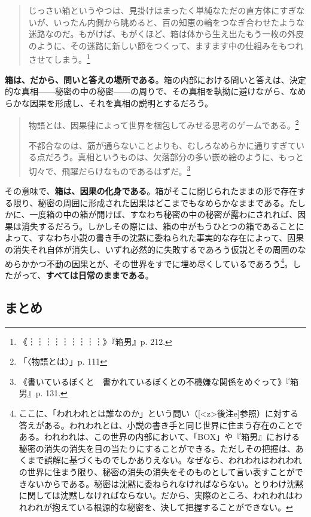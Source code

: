 \documentclass[9pt,b5j,twoside,twocolumn]{utarticle}
\begin{document}
\begin{quotation}
じっさい箱というやつは、見掛けはまったく単純なただの直方体にすぎないが、いったん内側から眺めると、百の知恵の輪をつなぎ合わせたような迷路なのだ。もがけば、もがくほど、箱は体から生え出たもう一枚の外皮のように、その迷路に新しい節をつくって、ますます中の仕組みをもつれさせてしまう。\footnote{《︙︙︙︙︙︙︙︙︙》『箱男』p. 212.}	
\end{quotation}

\textbf{箱は、だから、問いと答えの場所である}。箱の内部における問いと答えは、決定的な真相------秘密の中の秘密------の周りで、その真相を執拗に避けながら、なめらかな因果を形成し、それを真相の説明とするだろう。

\begin{quotation}
物語とは、因果律によって世界を梱包してみせる思考のゲームである。\footnote{「〈物語とは〉」p. 111}

不都合なのは、筋が通らないことよりも、むしろなめらかに通りすぎている点だろう。真相というものは、欠落部分の多い嵌め絵のように、もっと切々で、飛躍だらけなものであるはずだ。\footnote{《書いているぼくと　書かれているぼくとの不機嫌な関係をめぐって》『箱男』p. 131.}
\end{quotation}

その意味で、\textbf{箱は、因果の化身である}。箱がそこに閉じられたままの形で存在する限り、秘密の周囲に形成された因果はどこまでもなめらかなままである。たしかに、一度箱の中の箱が開けば、すなわち秘密の中の秘密が露わにされれば、因果は消失するだろう。しかしその際には、箱の中がもうひとつの箱であることによって、すなわち小説の書き手の沈黙に委ねられた事実的な存在によって、因果の消失それ自体が消失し、いずれ必然的に失敗するであろう仮説とその周囲のなめらかかつ不動の因果とが、その世界をすでに埋め尽くしているであろう\footnote{ここに、「われわれとは誰なのか」という問い（[\pbox<z>{後注e}]参照）に対する答えがある。われわれとは、小説の書き手と同じ世界に住まう存在のことである。われわれは、この世界の内部において、「BOX」や『箱男』における秘密の消失の消失を目の当たりにすることができる。ただしその把握は、あくまで誤解に基づくものでしかありえない。なぜなら、われわれはわれわれの世界に住まう限り、秘密の消失の消失をそのものとして言い表すことができないからである。秘密は沈黙に委ねられなければならない。とりわけ沈黙に関しては沈黙しなければならない。だから、実際のところ、われわれはわれわれが抱えている根源的な秘密を、決して把握することができない。}。したがって、\textbf{すべては日常のままである}。

\subsection*{まとめ}
\end{document}
